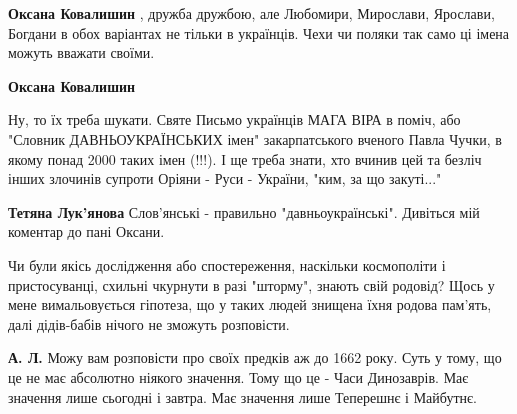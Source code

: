 \begin{itemize}
\begin{itemize}
\textbf{Оксана Ковалишин} , дружба дружбою, але Любомири, Мирослави, Ярослави,
Богдани в обох варіантах не тільки в українців. Чехи чи поляки так само ці
імена можуть вважати своїми.

 
\textbf{Оксана Ковалишин}

Ну, то їх треба шукати. Святе Письмо українців МАГА ВІРА в поміч, або "Словник
ДАВНЬОУКРАЇНСЬКИХ імен" закарпатського вченого Павла Чучки, в якому понад 2000
таких імен (!!!). І ще треба знати, хто вчинив цей та безліч інших злочинів
супроти Оріяни - Руси - України, "ким, за що закуті..."


 
\textbf{Тетяна Лук'янова}
Слов'янські - правильно "давньоукраїнські". Дивіться мій коментар до
пані Оксани.
\end{itemize}

 

Чи були якісь дослідження або спостереження, наскільки космополіти і
пристосуванці, схильні чкурнути в разі "шторму", знають свій родовід? Щось у
мене вимальовується гіпотеза, що у таких людей знищена їхня родова пам'ять,
далі дідів-бабів нічого не зможуть розповісти.

\begin{itemize}
 
\textbf{А. Л.} Можу вам розповісти про своїх предків аж до 1662 року. Суть у
тому, що це не має абсолютно ніякого значення. Тому що це - Часи Динозаврів.
Має значення лише сьогодні і завтра. Має значення лише Теперешнє і Майбутнє.
\end{itemize}


\end{itemize}
